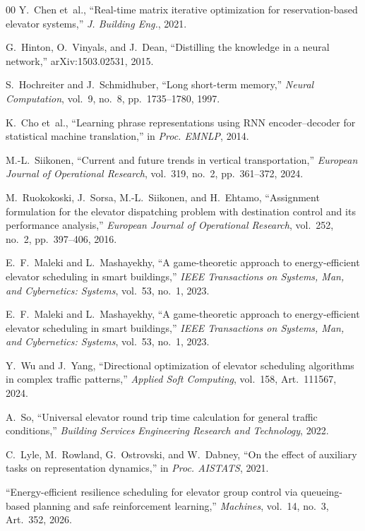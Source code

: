 \documentclass[conference]{IEEEtran}
\begin{document}
\begin{thebibliography}{00}
Y.~Chen et~al., ``Real-time matrix iterative optimization for
reservation-based elevator systems,'' \textit{J. Building Eng.},
2021.

G.~Hinton, O.~Vinyals, and J.~Dean, ``Distilling the knowledge in a
neural network,'' arXiv:1503.02531, 2015.

S.~Hochreiter and J.~Schmidhuber, ``Long short-term memory,''
\textit{Neural Computation}, vol.~9, no.~8, pp.~1735--1780, 1997.

K.~Cho et~al., ``Learning phrase representations using RNN
encoder--decoder for statistical machine translation,'' in
\textit{Proc. EMNLP}, 2014.


M.-L.~Siikonen, ``Current and future trends in vertical
transportation,'' \textit{European Journal of Operational Research},
vol.~319, no.~2, pp.~361--372, 2024.

M.~Ruokokoski, J.~Sorsa, M.-L.~Siikonen, and H.~Ehtamo,
``Assignment formulation for the elevator dispatching problem with
destination control and its performance analysis,'' \textit{European
Journal of Operational Research}, vol.~252, no.~2, pp.~397--406,
2016.

E.~F.~Maleki and L.~Mashayekhy, ``A game-theoretic approach to
energy-efficient elevator scheduling in smart buildings,''
\textit{IEEE Transactions on Systems, Man, and Cybernetics:
Systems}, vol.~53, no.~1, 2023.

E.~F.~Maleki and L.~Mashayekhy, ``A game-theoretic approach to
energy-efficient elevator scheduling in smart buildings,''
\textit{IEEE Transactions on Systems, Man, and Cybernetics:
Systems}, vol.~53, no.~1, 2023.

Y.~Wu and J.~Yang, ``Directional optimization of elevator
scheduling algorithms in complex traffic patterns,'' \textit{Applied
Soft Computing}, vol.~158, Art.~111567, 2024.

A.~So, ``Universal elevator round trip time calculation for general
traffic conditions,'' \textit{Building Services Engineering Research
and Technology}, 2022.

C.~Lyle, M.~Rowland, G.~Ostrovski, and W.~Dabney, ``On the effect of
auxiliary tasks on representation dynamics,'' in \textit{Proc.
AISTATS}, 2021.

``Energy-efficient resilience scheduling for elevator group control
via queueing-based planning and safe reinforcement learning,''
\textit{Machines}, vol.~14, no.~3, Art.~352, 2026.

\end{thebibliography}

\vspace{12pt}
\end{document}
